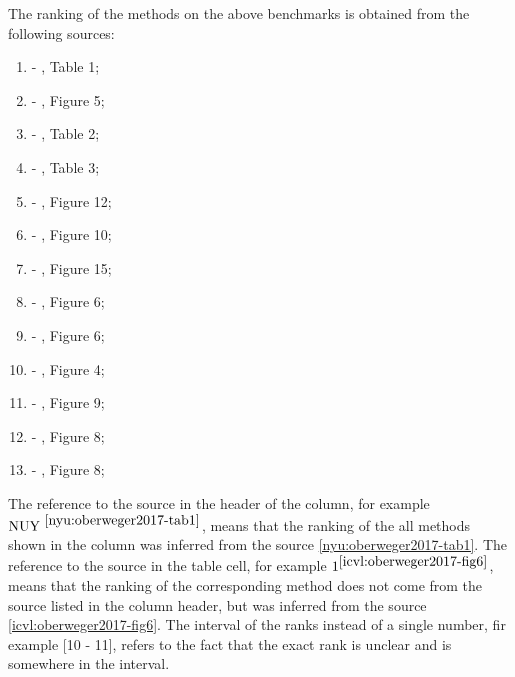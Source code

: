 The ranking of the methods on the above benchmarks is obtained from the following sources:
\vspace{-1em}
\begin{enumerate} [label=\textbf{\Alph*}]
\item \label{nyu:oberweger2017-tab1} - \cite{oberweger2017deepprior++}, Table 1;
\item \label{nyu1:oberweger2017-fig5} -  \cite{oberweger2017deepprior++}, Figure 5;
\item \label{icvl:oberweger2017-tab2} - \cite{oberweger2017deepprior++}, Table 2;
\item \label{msra:oberweger2017-tab3} - \cite{oberweger2017deepprior++}, Table 3;
\item \label{dexter:taylor2017-fig12} - \cite{taylor2017articulated}, Figure 12;
\item \label{fingerpaint:taylor2016-fig10} - \cite{taylor2016concerto}, Figure 10;
\item \label{handy:taylor2017-fig15} - \cite{taylor2017articulated}, Figure 15;
\item \label{icvl:oberweger2017-fig6} - \cite{oberweger2017deepprior++}, Figure 6;
\item \label{icvl:tang2015-fig6} - \cite{tang2015opening}, Figure 6;
\item \label{dexter:sridhar2015-fig4} - \cite{sridhar2015fast}, Figure 4;
\item \label{handy:tkach2017-fig9} - \cite{tkach2017online}, Figure 9;
\item \label{nyu:dibra2017-fig8} - \cite{dibra2017refine}, Figure 8;
\item \label{nyu:neverova2017-fig8} - \cite{neverova2017hand}, Figure 8;
\end{enumerate}

The reference to the source in the header of the column, for example  $\text{NUY }^{\ref{nyu:oberweger2017-tab1}}$, means that the ranking of the all methods shown in the column was inferred from the source \ref{nyu:oberweger2017-tab1}. The reference to the source in the table cell, for example	$1^{\ref{icvl:oberweger2017-fig6}}$,  means that the ranking of the corresponding method does not come from the source listed in the column header, but was inferred from the source \ref{icvl:oberweger2017-fig6}. The interval of the ranks instead of a single number, fir example [10 - 11], refers to the fact that the exact rank is unclear and is somewhere in the interval.


